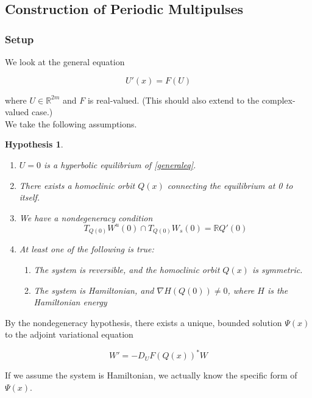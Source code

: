 \documentclass[12pt]{article}
\def\R{{\mathbb R}}
\newtheorem{hypothesis}{Hypothesis}
\begin{document}
\subsection{Construction of Periodic Multipulses}

\subsubsection{Setup}

We look at the general equation

\begin{equation}\label{generaleq}
U'(x) = F(U)
\end{equation}

where $U \in \R^{2m}$ and $F$ is real-valued. (This should also extend to the complex-valued case.)\\

We take the following assumptions.

\begin{hypothesis}\label{assumptions}
\[\]
\begin{enumerate}
	\item $U = 0$ is a hyperbolic equilibrium of \eqref{generaleq}.
	\item There exists a homoclinic orbit $Q(x)$ connecting the equilibrium at 0 to itself.
	\item We have a nondegeneracy condition
	\[
	T_{Q(0)} W^u(0) \cap T_{Q(0)} W_s(0) = \R Q'(0)
	\]
	\item At least one of the following is true:
	\begin{enumerate}
		\item The system is reversible, and the homoclinic orbit $Q(x)$ is symmetric.
		\item The system is Hamiltonian, and $\nabla H(Q(0)) \neq 0$, where $H$ is the Hamiltonian energy
	\end{enumerate}
\end{enumerate}
\end{hypothesis}

By the nondegeneracy hypothesis, there exists a unique, bounded solution $\Psi(x)$ to the adjoint variational equation

\begin{equation}
W' = -D_U F(Q(x))^* W
\end{equation}

If we assume the system is Hamiltonian, we actually know the specific form of $\Psi(x)$.

\end{document}
